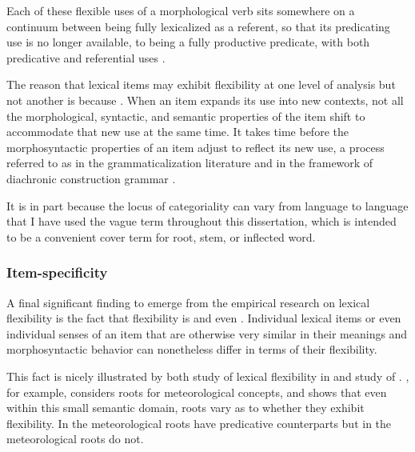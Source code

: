 \noindent Each of these flexible uses of a morphological verb sits somewhere on a continuum between being fully lexicalized as a referent, so that its predicating use is no longer available, to being a fully productive predicate, with both predicative and referential uses \parencite[413]{Mithun2000}.

The reason that lexical items may exhibit flexibility at one level of analysis but not another is because . When an item expands its use into new contexts, not all the morphological, syntactic, and semantic properties of the item shift to accommodate that new use at the same time. It takes time before the morphosyntactic properties of an item adjust to reflect its new use, a process referred to as  in the grammaticalization literature \parencite{DeSmet2012} and  in the framework of diachronic construction grammar \parencite[27]{TraugottTrousdale2013}.

It is in part because the locus of categoriality can vary from language to language that I have used the vague term  throughout this dissertation, which is intended to be a convenient cover term for root, stem, or inflected word.

\subsubsection{Item-specificity}
\label{sec:2.3.2.4}

A final significant finding to emerge from the empirical research on lexical flexibility is the fact that flexibility is  and even . Individual lexical items or even individual senses of an item that are otherwise very similar in their meanings and morphosyntactic behavior can nonetheless differ in terms of their flexibility.

This fact is nicely illustrated by both  study of lexical flexibility in  and  study of . \textcite[163--164]{Mithun2017}, for example, considers roots for meteorological concepts, and shows that even within this small semantic domain, roots vary as to whether they exhibit flexibility. In  the meteorological roots have predicative counterparts but in  the meteorological roots do not.

